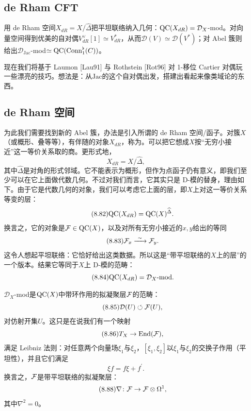 \subsection{de Rham CFT}
\begin{sectionkey}
用 de Rham 空间$X_{dR}=X/\widehat\Delta$把平坦联络纳入几何：$\mathrm{QC}(X_{dR})=\mathcal D_X$-mod。对向量空间得到优美的自对偶$V^{\vee}_{dR}[1]\simeq V^{*}_{dR}$，从而$\mathcal D(V)\simeq\mathcal D(V^{*})$；对 Abel 簇则给出$\mathcal D_{\mathrm{Jac}}$-mod$\simeq\mathrm{QC}(\mathrm{Conn}^{\flat}_1(C))$。
\end{sectionkey}

现在我们将基于 Laumon [Lau91] 与 Rothstein [Rot96] 对 1-移位 Cartier 对偶玩一些漂亮的技巧。想法是：从$\mathrm{Jac}$的这个自对偶出发，搭建出看起来像类域论的东西。

\subsection*{de Rham 空间}
为此我们需要找到新的 Abel 簇，办法是引入所谓的 de Rham 空间/函子。对簇$X$（或概形、叠等等），有伴随的对象$X_{dR}$，称为。可以把它想成$X$按“无穷小接近”这一等价关系取的商。更形式地，
\begin{equation}\tag{8.81}
X_{dR}=X/\widehat\Delta,
\end{equation}
其中$\widehat\Delta$是对角的形式邻域。它不能表示为概形，但作为点函子仍有意义，即我们至少可以在它上面做代数几何。不过对我们而言，它其实只是 D-模的替身，理由如下。由于它是代数几何的对象，我们可以考虑它上面的层，即$X$上对这一等价关系等变的层：
\begin{equation}\tag{8.82}
\mathrm{QC}(X_{dR})=\mathrm{QC}(X)^{\widehat\Delta}.
\end{equation}
换言之，它的对象是$\mathcal{F}\in\mathrm{QC}(X)$，以及对所有无穷小接近的$x,y$给出的等同
\begin{equation}\tag{8.83}
\mathcal{F}_x\xrightarrow{\ \sim\ }\mathcal{F}_y.
\end{equation}
这令人想起平坦联络：它恰好给出这类数据。所以这是“带平坦联络的$X$上的层”的一个版本。结果它等同于$X$上 D-模的范畴：
\begin{equation}\tag{8.84}
\mathrm{QC}(X_{dR})=\mathcal D_X\text{-mod}.
\end{equation}

$\mathcal D_X$-mod是$\mathrm{QC}(X)$中带环作用的拟凝聚层$\mathcal{F}$的范畴：
\begin{equation}\tag{8.85}
\mathcal D(U)\circlearrowleft\mathcal{F}(U),
\end{equation}
对仿射开集$U$。这只是在说我们有一个映射
\begin{equation}\tag{8.86}
T_X\to\mathrm{End}(\mathcal{F}),
\end{equation}
满足 Leibniz 法则：对任意两个向量场$\xi_1$与$\xi_2$，$[\xi_1,\xi_2]$以$\xi_1$与$\xi_2$的交换子作用（平坦性），并且它们满足
\begin{equation}\tag{8.87}
\xi f=f\xi+f^{\prime}.
\end{equation}
换言之，$\mathcal{F}$是带平坦联络的拟凝聚层：
\begin{equation}\tag{8.88}
\nabla\colon\mathcal{F}\to\mathcal{F}\otimes\Omega^{1},
\end{equation}
其中$\nabla^{2}=0$。

